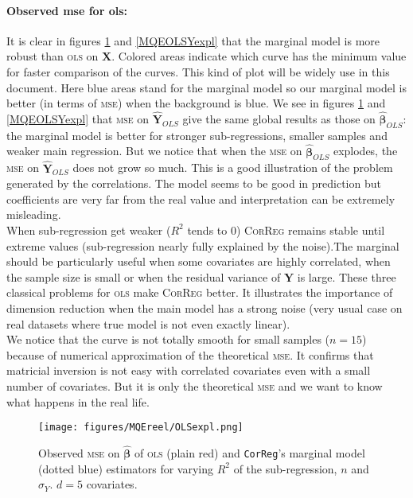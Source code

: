 \documentclass[12pt,a4paper]{report}
\begin{document}
		\paragraph{Observed {\sc mse} for {\sc ols}:} It is clear in figures \ref{MSEOLSexpl} and \ref{MQEOLSYexpl} that the marginal model is more robust than \textsc{ols} on $\boldsymbol{X}$. Colored areas indicate which curve has the minimum value for faster comparison of the curves. This kind of plot will be widely use in this document. Here blue areas stand for the marginal model so our marginal model is better (in terms of \textsc{mse}) when the background is blue.
	We see in figures \ref{MSEOLSexpl} and \ref{MQEOLSYexpl} that \textsc{mse} on $\hat{\boldsymbol{Y}}_{OLS}$ give the same global results as those on $\hat{\boldsymbol{\beta}}_{OLS}$: the marginal model is better for stronger sub-regressions, smaller samples and weaker main regression. But we notice that when the \textsc{mse} on $\hat{\boldsymbol{\beta}}_{OLS}$ explodes, the \textsc{mse} on $\hat{\boldsymbol{Y}}_{OLS}$ does not grow so much. This is a good illustration of the problem generated by the correlations. The model seems to be good in prediction but coefficients are very far from the real value and interpretation can be extremely misleading.\\
	
When sub-regression get weaker ($R^2$ tends to 0) \textsc{CorReg} remains stable until extreme values (sub-regression nearly fully explained by the noise).The marginal should be particularly useful when some covariates are highly correlated, when the sample size is small or when the residual variance of $\boldsymbol{Y}$ is large. These three classical problems for \textsc{ols} make \textsc{CorReg} better. It illustrates the importance of dimension reduction when the main model has a strong noise (very usual case on real datasets where true model is not even exactly linear). \\
	
	We notice that the curve is not totally smooth for small samples ($n=15$) because of numerical approximation of the theoretical \textsc{mse}. It confirms that matricial inversion is not easy with correlated covariates even with a small number of covariates. But it is only the theoretical \textsc{mse} and we want to know what happens in the real life. \\
	
 \begin{figure}[h!]
	\texttt{[image: figures/MQEreel/OLSexpl.png]}
	\caption{Observed \textsc{mse} on $\hat{\boldsymbol{\beta}}$ of \textsc{ols} (plain red) and {\tt CorReg}'s marginal model (dotted blue) estimators for varying $R^2$ of the sub-regression, $n$ and $\sigma_Y$. $d=5$ covariates.}\label{MSEOLSexpl}
\end{figure} 
	
\end{document}

